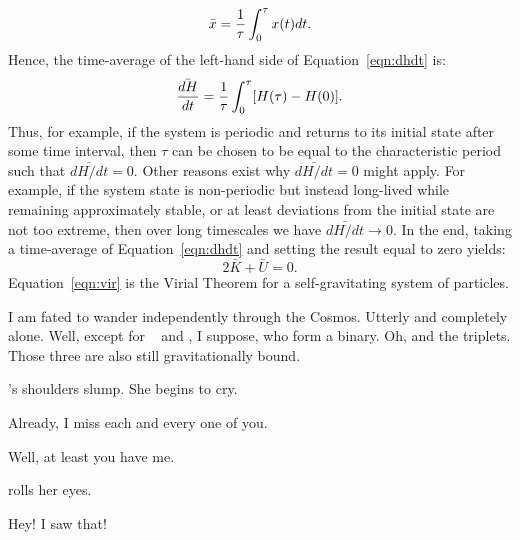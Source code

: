 \documentclass[main.tex]{subfiles}
\begin{document}
\begin{tcolorbox}[sharp corners, colback=blue!30, colframe=blue!80!blue, title=Virial Theorem]
{\begin{equation}
\bar{x} = \frac{1}{\tau}\int_{0}^{\rm \tau} x(t)dt.
\end{equation}
Hence, the time-average of the left-hand side of Equation~\ref{eqn:dhdt} is:
\begin{equation}
\bar{\frac{dH}{dt}} = \frac{1}{\tau}\int_{0}^{\rm \tau} [H(\tau) - H(0)].
\end{equation}
Thus, for example, if the system is periodic and returns to its initial state after some time interval, then $\tau$ can be chosen to be equal to the characteristic period such that $\bar{dH/dt} = 0$.  Other reasons exist why $\bar{dH/dt} = 0$ might apply.  For example, if the system state is non-periodic but instead long-lived while remaining approximately stable, or at least deviations from the initial state are not too extreme, then over long timescales we have $\bar{dH/dt} \rightarrow 0$.  In the end, taking a time-average of Equation~\ref{eqn:dhdt} and setting the result equal to zero yields:
\begin{equation}
2\bar{K} + \bar{U} = 0.
\label{eqn:vir}
\end{equation}
Equation~\ref{eqn:vir} is the Virial Theorem for a self-gravitating system of particles.}
\end{tcolorbox}

\par \Sterope I am fated to wander independently through the Cosmos.  Utterly and completely alone.  Well, except for \rmmaia~ and \rmmerope, I suppose, who form a binary.  Oh, and the triplets.  Those three are also still gravitationally bound.

\par \nar \rmalcyone's shoulders slump.  She begins to cry.

\par \Alcyone Already, I miss each and every one of you.

\par \Taygete Well, at least you have me.

\par \nar \rmalcyone rolls her eyes.

\par \Taygete Hey!  I saw that!
\end{document}

